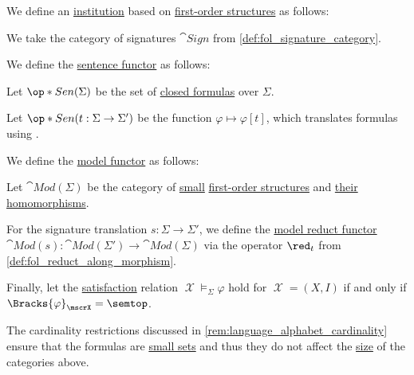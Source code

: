 \begin{definition}\label{def:fol_institution}\mimprovised
  We define an \hyperref[def:institution]{institution} based on \hyperref[def:fol_structure]{first-order structures} as follows:
  \begin{thmenum}
     We take the category of signatures \( \cat{Sign} \) from \cref{def:fol_signature_category}.

     We define the \hyperref[def:institution/sentences]{sentence functor} as follows:
    \begin{thmenum}
       Let \( \op*{Sen}(\Sigma) \) be the set of \hyperref[def:fol_closed_formula]{closed formulas} over \( \Sigma \).

       Let \( \op*{Sen}(t: \Sigma \to \Sigma') \) be the function \( \varphi \mapsto \varphi[t] \), which translates formulas using .
    \end{thmenum}

     We define the \hyperref[def:institution/models]{model functor} as follows:
    \begin{thmenum}
       Let \( \cat{Mod}(\Sigma) \) be the category of \hyperref[def:small_set]{small} \hyperref[def:fol_structure]{first-order structures} and \hyperref[def:fol_homomorphism]{their homomorphisms}.

       For the signature translation \( s: \Sigma \to \Sigma' \), we define the \hyperref[def:fol_institution/models/hom]{model reduct functor} \( \cat{Mod}(s): \cat{Mod}(\Sigma') \to \cat{Mod}(\Sigma) \) via the operator \( \red_t \) from \cref{def:fol_reduct_along_morphism}.
    \end{thmenum}

     Finally, let the \hyperref[def:institution/satisfaction]{satisfaction} relation \( \mscrX \vDash_{\Sigma} \varphi \) hold for \( \mscrX = (X, I) \) if and only if \( \Bracks{\varphi}_\mscrX = \semtop \).
  \end{thmenum}
\end{definition}
\begin{comments}
  \item The cardinality restrictions discussed in \cref{rem:language_alphabet_cardinality} ensure that the formulas are \hyperref[def:small_set]{small sets} and thus they do not affect the \hyperref[def:small_category]{size} of the categories above.
\end{comments}
